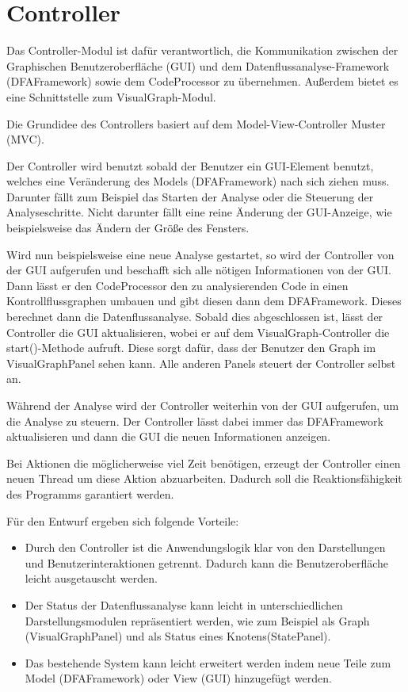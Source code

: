 
\section{Controller}

Das Controller-Modul ist dafür verantwortlich, die Kommunikation zwischen der Graphischen Benutzeroberfläche (GUI) und dem Datenflussanalyse-Framework (DFAFramework) sowie dem CodeProcessor zu übernehmen.
Außerdem bietet es eine Schnittstelle zum VisualGraph-Modul.

Die Grundidee des Controllers basiert auf dem Model-View-Controller Muster (MVC).

Der Controller wird benutzt sobald der Benutzer ein GUI-Element benutzt, welches eine Veränderung des Models (DFAFramework) nach sich ziehen muss. Darunter fällt zum Beispiel das Starten der Analyse oder die Steuerung der Analyseschritte.
Nicht darunter fällt eine reine Änderung der GUI-Anzeige, wie beispielsweise das Ändern der Größe des Fensters.

Wird nun beispielsweise eine neue Analyse gestartet, so wird der Controller von der GUI aufgerufen und beschafft sich alle nötigen Informationen von der GUI.
Dann lässt er den CodeProcessor den zu analysierenden Code in einen Kontrollflussgraphen umbauen und gibt diesen dann dem DFAFramework. Dieses berechnet dann die Datenflussanalyse.
Sobald dies abgeschlossen ist, lässt der Controller die GUI aktualisieren, wobei er auf dem VisualGraph-Controller die start()-Methode aufruft.
Diese sorgt dafür, dass der Benutzer den Graph im VisualGraphPanel sehen kann. Alle anderen Panels steuert der Controller selbst an.

Während der Analyse wird der Controller weiterhin von der GUI aufgerufen, um die Analyse zu steuern. Der Controller lässt dabei immer das DFAFramework aktualisieren und dann die GUI die neuen Informationen anzeigen.

Bei Aktionen die möglicherweise viel Zeit benötigen, erzeugt der Controller einen neuen Thread um diese Aktion abzuarbeiten.
Dadurch soll die Reaktionsfähigkeit des Programms garantiert werden.

Für den Entwurf ergeben sich folgende Vorteile:
\begin{itemize}
	\item Durch den Controller ist die Anwendungslogik klar von den Darstellungen und Benutzerinteraktionen getrennt.
	Dadurch kann die Benutzeroberfläche leicht ausgetauscht werden.
	\item Der Status der Datenflussanalyse kann leicht in unterschiedlichen Darstellungsmodulen repräsentiert werden, wie zum Beispiel als Graph (VisualGraphPanel) und als Status eines Knotens(StatePanel).
	\item Das bestehende System kann leicht erweitert werden indem neue Teile zum Model (DFAFramework) oder View (GUI) hinzugefügt werden.
\end{itemize}